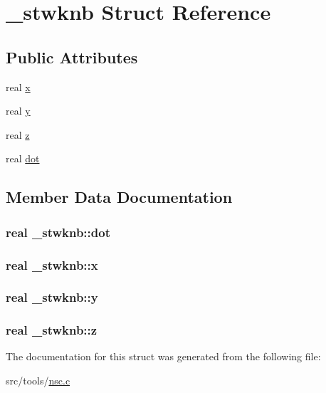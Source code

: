 \hypertarget{struct__stwknb}{\section{\-\_\-stwknb \-Struct \-Reference}
\label{struct__stwknb}
}
\subsection*{\-Public \-Attributes}
\begin{DoxyCompactItemize}
\item 
real \hyperlink{struct__stwknb_aa0365b27472a4412473fe89db32498d1}{x}
\item 
real \hyperlink{struct__stwknb_af22586f8abec142b6fba64d0f0bcfa65}{y}
\item 
real \hyperlink{struct__stwknb_aa34432fdce305425cd7737a4a1ca10a2}{z}
\item 
real \hyperlink{struct__stwknb_a9cbaaf44e0959796e0c705753e0daba7}{dot}
\end{DoxyCompactItemize}


\subsection{\-Member \-Data \-Documentation}
\hypertarget{struct__stwknb_a9cbaaf44e0959796e0c705753e0daba7}{
\subsubsection[{dot}]{\setlength{\rightskip}{0pt plus 5cm}real {\bf \-\_\-stwknb\-::dot}}}\label{struct__stwknb_a9cbaaf44e0959796e0c705753e0daba7}
\hypertarget{struct__stwknb_aa0365b27472a4412473fe89db32498d1}{
\subsubsection[{x}]{\setlength{\rightskip}{0pt plus 5cm}real {\bf \-\_\-stwknb\-::x}}}\label{struct__stwknb_aa0365b27472a4412473fe89db32498d1}
\hypertarget{struct__stwknb_af22586f8abec142b6fba64d0f0bcfa65}{
\subsubsection[{y}]{\setlength{\rightskip}{0pt plus 5cm}real {\bf \-\_\-stwknb\-::y}}}\label{struct__stwknb_af22586f8abec142b6fba64d0f0bcfa65}
\hypertarget{struct__stwknb_aa34432fdce305425cd7737a4a1ca10a2}{
\subsubsection[{z}]{\setlength{\rightskip}{0pt plus 5cm}real {\bf \-\_\-stwknb\-::z}}}\label{struct__stwknb_aa34432fdce305425cd7737a4a1ca10a2}


\-The documentation for this struct was generated from the following file\-:\begin{DoxyCompactItemize}
\item 
src/tools/\hyperlink{nsc_8c}{nsc.\-c}\end{DoxyCompactItemize}
